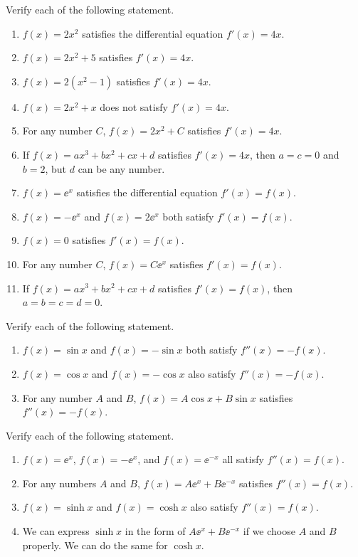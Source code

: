 \documentclass[11pt,pdfa,lastpage]{MishoNote}
\begin{document}
\begin{enumerate}[resume]
  \itemA Verify each of the following statement.
  \begin{enumerate}
    \item $f(x)=2x^2$ satisfies the differential equation $f'(x)=4x$.
    \item $f(x)=2x^2+5$ satisfies $f'(x)=4x$.
    \item $f(x)=2(x^2-1)$ satisfies $f'(x)=4x$.
    \item $f(x)=2x^2+x$ does not satisfy $f'(x)=4x$.
    \item For any number $C$, $f(x)=2x^2 + C$ satisfies $f'(x)=4x$.
    \item If $f(x)=ax^3+bx^2+cx+d$ satisfies $f'(x)=4x$, then $a=c=0$ and $b=2$, but $d$ can be any number.
  \medskip
    \item $f(x)=\ee^x$ satisfies the differential equation $f'(x)=f(x)$.
    \item $f(x)=-\ee^x$ and $f(x)=2\ee^x$ both satisfy $f'(x)=f(x)$.
    \item $f(x)=0$ satisfies $f'(x)=f(x)$.
    \item For any number $C$, $f(x)=C\ee^{x}$ satisfies $f'(x)=f(x)$.
    \item If $f(x)=ax^3+bx^2+cx+d$ satisfies $f'(x)=f(x)$, then $a=b=c=d=0$.
  \end{enumerate}
  \itemB Verify each of the following statement.
  \begin{enumerate}
    \item $f(x)=\sin x$ and $f(x)=-\sin x$ both satisfy $f''(x)=-f(x)$.
    \item $f(x)=\cos x$ and $f(x)=-\cos x$ also satisfy $f''(x)=-f(x)$.
    \item For any number $A$ and $B$, $f(x)=A\cos x+B\sin x$ satisfies $f''(x)=-f(x)$.
  \end{enumerate}
  \itemC Verify each of the following statement.
  \begin{enumerate}
    \item $f(x)=\ee^x$, $f(x)=-\ee^x$, and $f(x)=\ee^{-x}$ all satisfy $f''(x)=f(x)$.
    \item For any numbers $A$ and $B$, $f(x)=A\ee^x+B\ee^{-x}$ satisfies $f''(x)=f(x)$.
    \item $f(x)=\sinh x$ and $f(x)=\cosh x$ also satisfy $f''(x)=f(x)$.
    \item We can express $\sinh x$ in the form of $A\ee^{x}+B\ee^{-x}$ if we choose $A$ and $B$ properly. We can do the same for $\cosh x$.
  \end{enumerate}
\end{enumerate}
\end{document}
